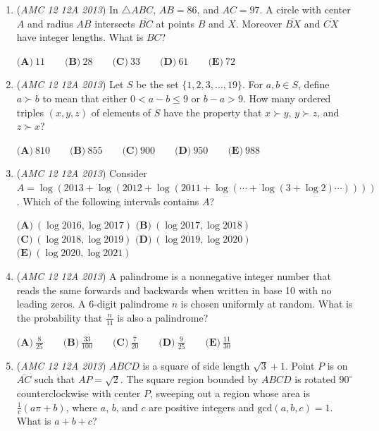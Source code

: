 \begin{enumerate}
 $\textbf{(A)} \ \sqrt{2} \qquad \textbf{(B)} \ \frac{3}{2} \qquad \textbf{(C)} \ \frac{5}{3} \qquad \textbf{(D)} \ \sqrt{3} \qquad \textbf{(E)} \ 2$


	\item (\textit{AMC 12 12A 2013}) In $\bigtriangleup ABC$, $AB = 86$, and $AC = 97$. A circle with center $A$ and radius $AB$ intersects $\overline{BC}$ at points $B$ and $X$. Moreover $\overline{BX}$ and $\overline{CX}$ have integer lengths. What is $BC$?


 $\textbf{(A)} \ 11 \qquad  \textbf{(B)} \ 28 \qquad  \textbf{(C)} \ 33 \qquad  \textbf{(D)} \ 61 \qquad  \textbf{(E)} \ 72$


	\item (\textit{AMC 12 12A 2013}) Let $S$ be the set $\{1,2,3,...,19\}$. For $a,b \in S$, define $a \succ b$ to mean that either $0 < a - b \le 9$ or $b - a > 9$. How many ordered triples $(x,y,z)$ of elements of $S$ have the property that $x \succ y$, $y \succ z$, and $z \succ x$?


 $\textbf{(A)} \ 810 \qquad  \textbf{(B)} \ 855 \qquad  \textbf{(C)} \ 900 \qquad  \textbf{(D)} \ 950 \qquad  \textbf{(E)} \ 988$


	\item (\textit{AMC 12 12A 2013}) Consider $A = \log (2013 + \log (2012 + \log (2011 + \log (\cdots + \log (3 + \log 2) \cdots ))))$. Which of the following intervals contains $A$?


 $\textbf{(A)} \ (\log 2016, \log 2017)$
$\textbf{(B)} \ (\log 2017, \log 2018)$
$\textbf{(C)} \ (\log 2018, \log 2019)$
$\textbf{(D)} \ (\log 2019, \log 2020)$
$\textbf{(E)} \ (\log 2020, \log 2021)$


	\item (\textit{AMC 12 12A 2013}) A palindrome is a nonnegative integer number that reads the same forwards and backwards when written in base 10 with no leading zeros. A 6-digit palindrome $n$ is chosen uniformly at random. What is the probability that $\frac{n}{11}$ is also a palindrome?


 $\textbf{(A)} \ \frac{8}{25} \qquad \textbf{(B)} \ \frac{33}{100} \qquad \textbf{(C)} \ \frac{7}{20} \qquad \textbf{(D)} \ \frac{9}{25} \qquad \textbf{(E)} \ \frac{11}{30}$


	\item (\textit{AMC 12 12A 2013}) $ABCD$ is a square of side length $\sqrt{3} + 1$. Point $P$ is on $\overline{AC}$ such that $AP = \sqrt{2}$. The square region bounded by $ABCD$ is rotated $90^{\circ}$ counterclockwise with center $P$, sweeping out a region whose area is $\frac{1}{c} (a \pi + b)$, where $a$, $b$, and $c$ are positive integers and $\text{gcd}(a,b,c) = 1$. What is $a + b + c$?



\end{enumerate}

